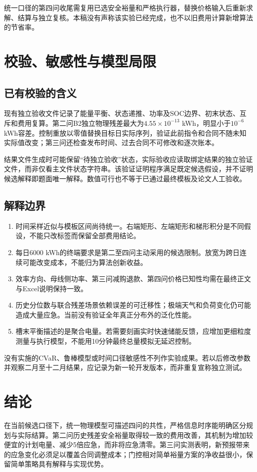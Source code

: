 \documentclass[UTF8,a4paper,zihao=-4,fontset=fandol]{ctexart}
\begin{document}
统一口径的第四问收尾需复用已选安全裕量和严格执行器，替换价格输入后重新求解、结算与独立复核。本稿没有声称该实验已经完成，也不以旧费用计算新增算法的节省率。

\section{校验、敏感性与模型局限}
\subsection{已有校验的含义}
现有独立验收文件记录了能量平衡、状态递推、功率及SOC边界、初末状态、互斥和费用复算。第二问B2独立物理残差最大为$4.55\times10^{-13}$ kWh，明显小于$10^{-6}$ kWh容差。控制重放以零值替换目标日实际序列，验证此前指令和合同不随未知实际值改变；第三问还检查发布时间、过去合同不可修改和逐次账本。

结果文件生成时可能保留“待独立验收”状态，实际验收应读取绑定结果的独立验证文件，而非仅看主文件状态字符串。该验证证明程序满足既定候选假设，并不证明候选解释即题面唯一解释。数值可行也不等于已通过最终模板及论文人工验收。

\subsection{解释边界}
\begin{enumerate}
\item 时间采样近似与模板区间尚待统一。右端矩形、左端矩形和梯形积分是不同假设，不能只改标签而保留全部费用结论。
\item 每日6000 kWh的终端要求是第二至四问主动采用的候选限制。放宽为跨日连续可能改变成本，不能归为算法创新收益。
\item 效率方向、母线侧功率、第三问减购退款、第四问价格已知性均需在最终正文与Excel说明保持一致。
\item 历史分位数与联合残差场景依赖误差的可迁移性；极端天气和负荷变化仍可能造成大量应急。当前没有验证全年真正分布外的泛化性能。
\item 槽末平衡描述的是聚合电量。若需要刻画实时快速储能反馈，应增加更细粒度测量与执行模型，不能用10分钟最终总量模拟无延迟控制。
\end{enumerate}
没有实施的CVaR、鲁棒模型或时间口径敏感性不列作实验成果。若以后修改参数并观察二月至十二月结果，应记录为新一轮开发版本，而非重复宣称独立测试。

\section{结论}
在当前候选口径下，统一物理模型可描述四问的共性，严格信息时序能明确区分规划与实际结算。第二问历史残差安全裕量取得较一致的费用改善，其机制为增加较便宜的计划电量、减少5倍应急，而非将应急清零。第三问实测表明，新预报带来的应急变化必须足以覆盖合同调整成本；门控相对简单裕量方案的净收益很小，保留简单策略具有解释与实现优势。
\end{document}
